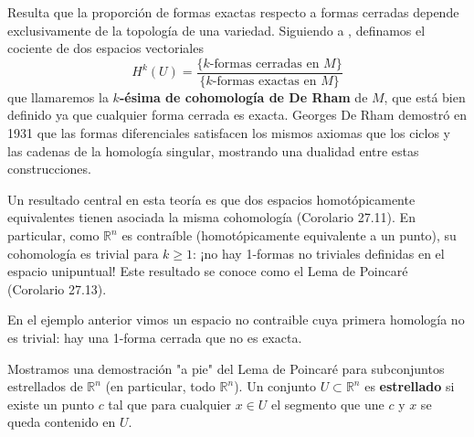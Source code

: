 \documentclass[spanish]{book}
\theoremstyle{definition}
\newcommand{\R}{\mathbb{R}}
\begin{document}
	Resulta que la proporción de formas exactas respecto a formas cerradas depende exclusivamente de la topología de una variedad. Siguiendo a \cite{Loring}, definamos el cociente de dos espacios vectoriales
	\[H^k(U)=\frac{\{k\text{-formas cerradas en }M\}}{\{k\text{-formas exactas en }M\}}\]
	que llamaremos la \textbf{$k$-ésima de cohomología de De Rham} de $M$, que está bien definido ya que cualquier forma cerrada es exacta. Georges De Rham demostró en 1931 que las formas diferenciales satisfacen los mismos axiomas que los ciclos y las cadenas de la homología singular, mostrando una dualidad entre estas construcciones.
	
	Un resultado central en esta teoría es que dos espacios homotópicamente equivalentes tienen asociada la misma cohomología (Corolario 27.11). En particular, como $\R^n$ es contraíble (homotópicamente equivalente a un punto), su cohomología es trivial para $k\geq1$: ¡no hay 1-formas no triviales definidas en el espacio unipuntual! Este resultado se conoce como el Lema de Poincaré (Corolario 27.13).
	
	En el ejemplo anterior vimos un espacio no contraible cuya primera homología no es trivial: hay una 1-forma cerrada que no es exacta.
	
	Mostramos una demostración "a pie" del Lema de Poincaré para subconjuntos estrellados de $\R^n$ (en particular, todo $\R^n$). Un conjunto $U\subset \R^n$ es \textbf{estrellado} si existe un punto $c$ tal que para cualquier $x\in U$ el segmento que une $c$ y $x$ se queda contenido en $U$.
	
\end{document}
